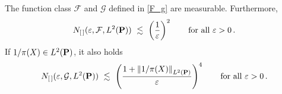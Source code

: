 \begin{lemma}
  \label{bracketing_number_lem}
  The function class $\mathcal{F}$ and $\mathcal{G}$ defined in \eqref{F_g} are measurable.
  Furthermore, 
  \begin{gather*}
    N_{[\,]}
    (
    \varepsilon
    ,
    \mathcal{F}, L^2(\P))
    \ 
    \lesssim
    \ 
    \left( 
      \frac{1}{\varepsilon}
    \right)^2
    \qquad
    \text{for all}
    \ 
    \varepsilon>0
    \,.
  \end{gather*}
  If $1/\pi(X)\in L^2(\P)$, it also holds 
  \begin{gather*}
    N_{[\,]}
    (
    \varepsilon
    ,
    \mathcal{G}, L^2(\P))
    \ 
    \lesssim
    \ 
    \left( 
    \frac{
      1+
    \norm{1/\pi(X)}_{ L^2(\P)}
    }
    {\varepsilon}
    \right)^4
    \qquad
    \text{for all}
    \ 
    \varepsilon>0
    \,.
  \end{gather*}
\end{lemma}
